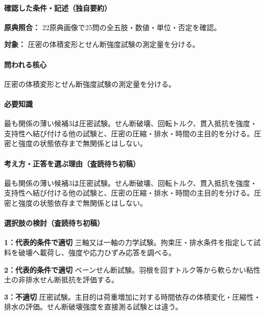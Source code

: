 \paragraph{確認した条件・記述（独自要約）}\mbox{}\par

\noindent\textbf{原典照合：} 22原典画像で25問の全五肢・数値・単位・否定を確認。\par

\noindent\textbf{対象：} 圧密の体積変形とせん断強度試験の測定量を分ける。\par

\paragraph{問われる核心} 圧密の体積変形とせん断強度試験の測定量を分ける。

\paragraph{必要知識} 最も関係の薄い候補3は圧密試験。せん断破壊、回転トルク、貫入抵抗を強度・支持性へ結び付ける他の試験と、圧密の圧縮・排水・時間の主目的を分ける。圧密と強度の状態依存まで無関係とはしない。

\paragraph{考え方・正答を選ぶ理由（査読待ち初稿）} 最も関係の薄い候補3は圧密試験。せん断破壊、回転トルク、貫入抵抗を強度・支持性へ結び付ける他の試験と、圧密の圧縮・排水・時間の主目的を分ける。圧密と強度の状態依存まで無関係とはしない。

\paragraph{選択肢の検討（査読待ち初稿）}\mbox{}\par

\noindent\textbf{1：代表的条件で適切} 三軸又は一軸の力学試験。拘束圧・排水条件を指定して試料を破壊へ載荷し、強度や応力ひずみ応答を調べる。\par

\noindent\textbf{2：代表的条件で適切} ベーンせん断試験。羽根を回すトルク等から軟らかい粘性土の非排水せん断抵抗を評価する。\par

\noindent\textbf{3：不適切} 圧密試験。主目的は荷重増加に対する時間依存の体積変化・圧縮性・排水の評価。せん断破壊強度を直接測る試験とは違う。\par


